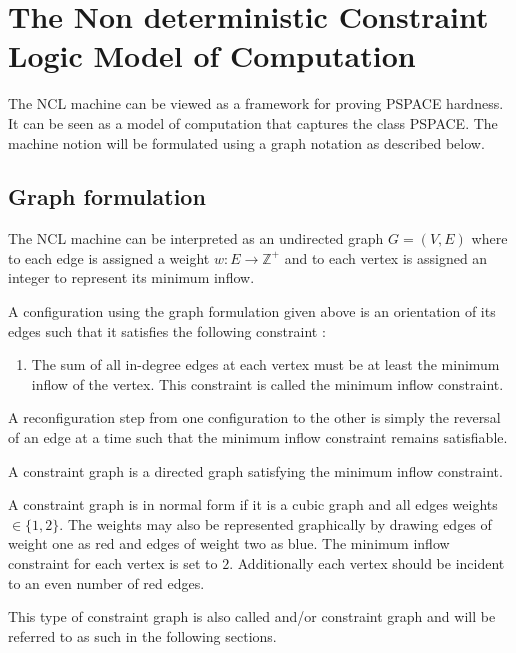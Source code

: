 \section{The Non deterministic Constraint Logic Model of
Computation}
\label{sec:NCL}
The NCL machine can be viewed as a framework for proving PSPACE hardness. It can be seen as a model of computation that captures the class PSPACE. The machine notion will be formulated using a graph notation as described below.  

\subsection{Graph formulation}
The NCL machine can be interpreted as an undirected graph $G = (V,E)$ where to each edge is assigned a weight $w : E \rightarrow \mathbb{Z^+}$ and to each vertex is assigned an integer to represent its minimum inflow. 

\begin{defn}
A configuration using the graph formulation given above is an orientation of its edges such that it satisfies the following constraint : 
\begin{enumerate}
    \item  The sum of all in-degree edges at each vertex must be at least the minimum inflow of the vertex. This constraint is called the minimum inflow constraint.
\end{enumerate}
\end{defn}

\begin{defn}
A reconfiguration step from one configuration to the other is simply the reversal of an edge at a time such that the minimum inflow constraint remains satisfiable. 
\end{defn}

\begin{defn}
A constraint graph is a directed graph satisfying the minimum inflow constraint.
\end{defn}

\begin{defn}
A constraint graph is in normal form if it is a cubic graph and all edges weights $\in \{1,2\}$. The weights may also be represented graphically by drawing edges of weight one as red and edges of weight two as blue. The minimum inflow constraint for each vertex is set to $2$. Additionally each vertex should be incident to an even number of red edges. 

This type of constraint graph is also called and/or constraint graph and will be referred to as such in the following sections. 
\end{defn}

